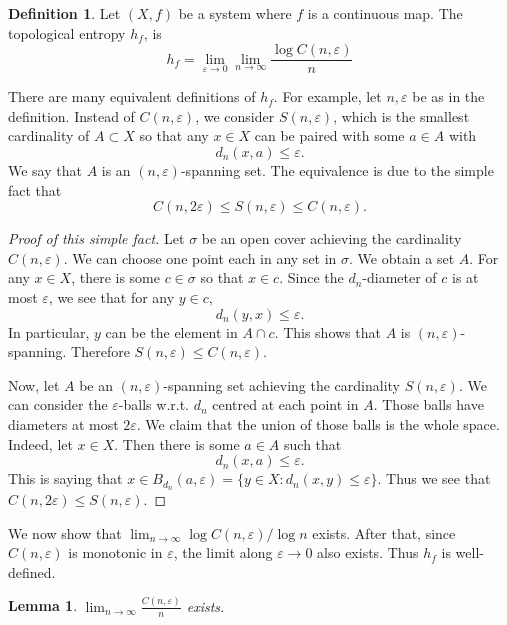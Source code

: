\documentclass[12pt]{article}
\newtheorem{lemma}[theorem]{Lemma}
\theoremstyle{definition}
\newtheorem{definition}[theorem]{Definition}
\theoremstyle{remark}
\begin{document}
\begin{definition}
     Let $(X,f)$ be a system where $f$ is a continuous map. The topological entropy $h_f$, is
     \[
     h_f=\lim_{\varepsilon\to 0}\lim_{n\to\infty} \frac{\log C(n,\varepsilon)}{n}
     \]
\end{definition}
There are many equivalent definitions of $h_f$. For example, let $n,\varepsilon$ be as in the definition. Instead of $C(n,\varepsilon)$, we consider $S(n,\varepsilon)$, which is the smallest cardinality of $A\subset X$ so that any $x\in X$ can be paired with some $a\in A$ with
\[
d_n(x,a)\leq \varepsilon.
\]
We say that $A$ is an $(n,\varepsilon)$-spanning set. The equivalence is due to the simple fact that
\[
C(n,2\varepsilon)\leq S(n,\varepsilon)\leq C(n,\varepsilon).
\]
\begin{proof}[Proof of this simple fact]
Let $\sigma$ be an open cover achieving the cardinality $C(n,\varepsilon)$. We can choose one point each in any set in $\sigma$. We obtain a set $A$. For any $x\in X$, there is some $c\in \sigma$ so that $x\in c$. Since the $d_n$-diameter of $c$ is at most $\varepsilon$, we see that for any $y\in c$, 
\[
d_n(y,x)\leq \varepsilon.
\]
In particular, $y$ can be the element in $A\cap c$. This shows that $A$ is $(n,\varepsilon)$-spanning. Therefore $S(n,\varepsilon)\leq C(n,\varepsilon).$

Now, let $A$ be an $(n,\varepsilon)$-spanning set achieving the cardinality $S(n,\varepsilon).$ We can consider the $\varepsilon$-balls w.r.t. $d_n$ centred at each point in $A$. Those balls have diameters at most $2\varepsilon$. We claim that the union of those balls is the whole space. Indeed, let $x\in X$. Then there is some $a\in A$ such that
\[
d_n(x,a)\leq \varepsilon.
\]
This is saying that $x\in B_{d_n}(a,\varepsilon)=\{y\in X: d_n(x,y)\leq \varepsilon\}.$ Thus we see that $C(n,2\varepsilon)\leq S(n,\varepsilon).$
\end{proof}

We now show that $\lim_{n\to\infty} \log C(n,\varepsilon)/\log n$ exists. After that, since $C(n,\varepsilon)$ is monotonic in $\varepsilon$, the limit along $\varepsilon\to 0$ also exists. Thus $h_f$ is well-defined.

\begin{lemma}
$\lim_{n\to\infty} \frac{C(n,\varepsilon)}{n}$ exists.
\end{lemma}
\end{document}
